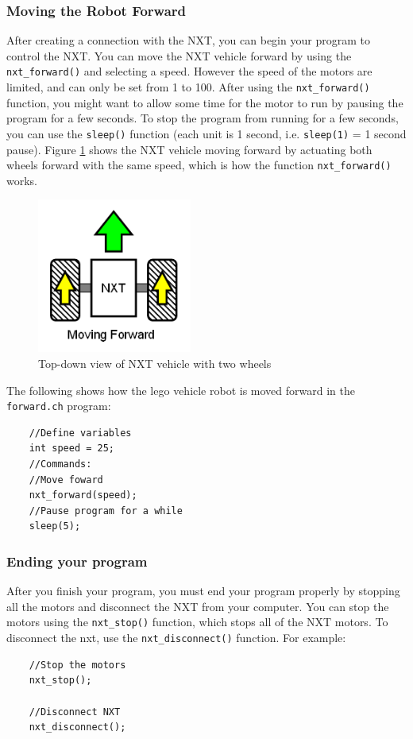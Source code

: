 \documentclass[12pt]{article}
\begin{document}
\subsubsection{Moving the Robot Forward}
After creating a connection with the NXT, you can begin your program to control the NXT. You can move the NXT vehicle 
forward by using the \verb+nxt_forward()+ and selecting a speed. However the speed of the motors are limited, 
and can only be set from 1 to 100. After using the \verb+nxt_forward()+ function, you might want to allow some time 
for the motor to run by pausing the program for a few seconds. To stop the program from running for a few seconds, 
you can use the \verb+sleep()+ function (each unit is 1 second, i.e. \verb+sleep(1)+ = 1 second pause). 
Figure \ref{fig_NXT_forward} shows the NXT vehicle moving forward by actuating both wheels forward with the same speed, 
which is how the function \verb+nxt_forward()+ works.

\begin{figure}[h]
  \begin{center}
    \includegraphics[height=2in]{figure/mindstorm/Vehicle_forward.png}
    \caption{Top-down view of NXT vehicle with two wheels\label{fig_NXT_forward}}
  \end{center}
\end{figure}

The following shows how the lego vehicle robot is moved forward in the \verb+forward.ch+ program:

\begin{verbatim}
    //Define variables
    int speed = 25;
    //Commands:
    //Move foward
    nxt_forward(speed);
    //Pause program for a while
    sleep(5);
\end{verbatim}

\subsubsection{Ending your program}
After you finish your program, you must end your program properly by stopping all the motors and disconnect 
the NXT from your computer. You can stop the motors using the \verb+nxt_stop()+ function, which stops all of the 
NXT motors. To disconnect the nxt, use the \verb+nxt_disconnect()+ function. For example:
\newline
\\
\begin{verbatim}
    //Stop the motors
    nxt_stop();
    
    //Disconnect NXT
    nxt_disconnect();
\end{verbatim}
\end{document}
